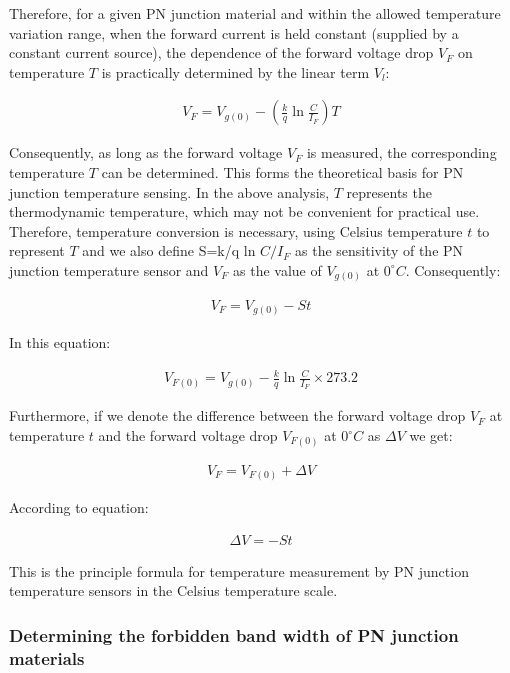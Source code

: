 \documentclass[UTF8]{article}
\begin{document}
   Therefore, for a given PN junction material and within the allowed temperature variation range, when the forward current is held constant (supplied by a constant current source), the dependence of the forward voltage drop $V_F$ on temperature $T$ is practically determined by the linear term $V_l$:
   
   \begin{eqnarray}
   V_{F}=V_{g(0)}-\left(\frac{k}{q} \ln \frac{C}{I_{F}}\right) T
   \end{eqnarray}
   
   Consequently, as long as the forward voltage $V_F$ is measured, the corresponding temperature $T$ can be determined. This forms the theoretical basis for PN junction temperature sensing. In the above analysis, $T$ represents the thermodynamic temperature, which may not be convenient for practical use. Therefore, temperature conversion is necessary, using Celsius temperature $t$ to represent $T$ and we also define S=k/q ln $C/I_F$  as the sensitivity of the PN junction temperature sensor and $V_F$ as the value of  $V_{g(0)}$ at $0^{\circ}C$. Consequently:
   
   \begin{eqnarray}
   V_{F}=V_{g(0)}-St
   \end{eqnarray}
   
   In this equation:
   
   \begin{eqnarray}
   V_{F(0)}=V_{g(0)}-\frac{k}{q} \ln \frac{C}{I_{F}} \times 273.2
   \end{eqnarray}
   
	Furthermore, if we denote the difference between the forward voltage drop $V_F$ at temperature $t$ and the forward voltage drop $V_{F(0)}$ at $0^{\circ}C$ as $\Delta V$ we get:
	
	\begin{eqnarray}
	V_{F}=V_{F(0)}+\Delta V
	\end{eqnarray}
   
   According to equation:
   
   \begin{eqnarray}
   \Delta V=-S t
   \end{eqnarray}
   
   This is the principle formula for temperature measurement by PN junction temperature sensors in the Celsius temperature scale.
   
   \subsubsection{Determining the forbidden band width of PN junction materials}
   
\end{document}
